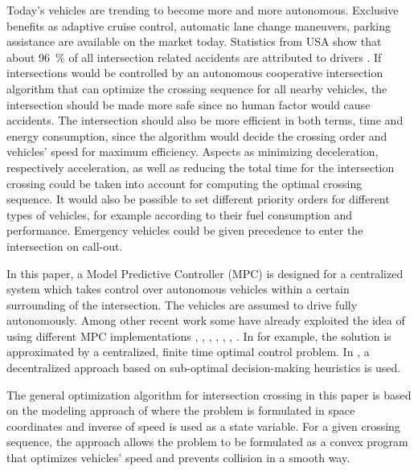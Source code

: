 \documentclass[letterpaper,10pt,conference]{ieeeconf}
\begin{document}
Today's vehicles are trending to become more and more autonomous. Exclusive benefits as adaptive cruise control, automatic lane change maneuvers, parking assistance are available on the market today. Statistics from USA show that about \SI{96}{\%} of all intersection related accidents are attributed to drivers \cite{nhtsa}. If intersections would be controlled by an autonomous cooperative intersection algorithm that can optimize the crossing sequence for all nearby vehicles, the intersection should be made more safe since no human factor would cause accidents. The intersection should also be more efficient in both terms, time and energy consumption, since the algorithm would decide the crossing order and vehicles' speed for maximum efficiency. Aspects as minimizing deceleration, respectively acceleration, as well as reducing the total time for the intersection crossing could be taken into account for computing the optimal crossing sequence. It would also be possible to set different priority orders for different types of vehicles, for example according to their fuel consumption and performance. Emergency vehicles could be given precedence to enter the intersection on call-out.

In this paper, a Model Predictive Controller (MPC) is designed for a centralized system which takes control over autonomous vehicles within a certain surrounding of the intersection. The vehicles are assumed to drive fully autonomously. Among other recent work some have already exploited the idea of using different MPC implementations \cite{eleven}, \cite{twelve}, \cite{thirteen}, \cite{fourteen}, \cite{fifteen}, \cite{gillet}, \cite{nikolce}. In \cite{thirteen} for example, the solution is approximated by a centralized, finite time optimal control problem. In \cite{fourteen}, a decentralized approach based on sub-optimal decision-making heuristics is used.

The general optimization algorithm for intersection crossing in this
paper is based on the modeling approach of \cite{nikolce} where the
problem is formulated in space coordinates and inverse of speed is
used as a state variable. For a given crossing sequence, the approach
allows the problem to be formulated as a convex program that optimizes
vehicles' speed and prevents collision in a smooth way. 
\end{document}

